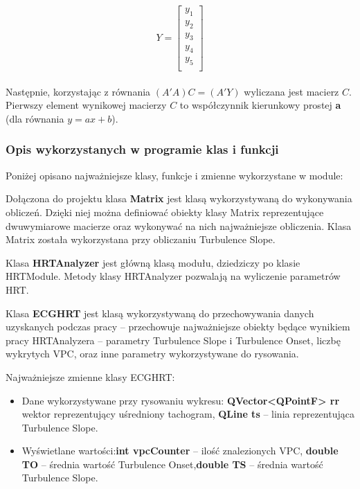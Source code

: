 \documentclass[a4paper, 11pt]{article}
\begin{document}
\begin{equation}
Y =  \left[
 \begin{array}{ccc}
   y_{1} \\
   y_{2} \\
   y_{3} \\ 
   y_{4} \\
   y_{5} \\ 
 \end{array}
\right]
\end{equation}
\\
Następnie, korzystając z równania  $(A' A)C = (A'Y)$ wyliczana jest macierz $C$.
Pierwszy element wynikowej macierzy $C$ to współczynnik kierunkowy prostej \textbf{a} (dla równania $y = ax + b$).
\subsubsection{Opis wykorzystanych w programie klas i funkcji}
\label{sec:hrt:results}

Poniżej opisano najważniejsze klasy, funkcje i zmienne wykorzystane w module:
   
Dołączona do projektu klasa \textbf{Matrix} jest klasą wykorzystywaną do wykonywania obliczeń. Dzięki niej można
definiować obiekty klasy Matrix reprezentujące dwuwymiarowe macierze oraz wykonywać na nich najważniejsze obliczenia.
Klasa Matrix została wykorzystana przy obliczaniu Turbulence Slope.

Klasa  \textbf{HRTAnalyzer} jest główną klasą modułu, dziedziczy po klasie HRTModule. Metody klasy HRTAnalyzer 
pozwalają na wyliczenie parametrów HRT.

Klasa \textbf{ECGHRT} jest klasą wykorzystywaną do przechowywania danych uzyskanych podczas pracy  -- przechowuje
najważniejsze obiekty będące wynikiem pracy HRTAnalyzera  -- parametry Turbulence Slope i Turbulence Onset, 
liczbę wykrytych VPC, oraz inne parametry wykorzystywane do rysowania.

Najważniejsze zmienne klasy ECGHRT:
\begin{itemize} 
\item Dane wykorzystywane przy rysowaniu wykresu: \textbf{QVector<QPointF> rr} wektor reprezentujący uśredniony tachogram, 
\textbf{QLine ts} -- linia reprezentująca Turbulence Slope.
\item Wyświetlane wartości:\textbf{int vpcCounter}  -- ilość znalezionych VPC, \textbf{double TO} --  średnia wartość Turbulence Onset,\textbf{double TS}  -- średnia wartość Turbulence Slope.
\end{itemize}
\end{document}
